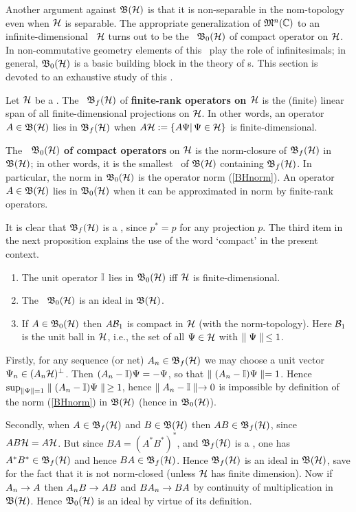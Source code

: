 Another argument against ${\frak B}({\cal H})$ is that it is non-separable in the
nom-topology even when ${\cal H}$ is separable. The appropriate
generalization of ${\frak M}^n({\Bbb C})$ to an infinite-dimensional \Hs\ ${\cal H}$
turns out to be the \ca\ ${\frak B}_0({\cal H})$ of compact operator on ${\cal H}$. In
non-commutative geometry elements of this \ca\ play the role of
infinitesimals; in general, ${\frak B}_0({\cal H})$ is a basic building block in
the theory of \ca s.  This section is devoted to an exhaustive study
of this \ca.
\begin{Definition}
Let ${\cal H}$ be a \Hs.  The \sta\ ${\frak B}_f({\cal H})$ of {\bf finite-rank operators
on ${\cal H}$} is the (finite) linear span of all finite-dimensional
projections on ${\cal H}$. In other words, an operator $A\in{\frak B}({\cal H})$ lies in
${\frak B}_f({\cal H})$ when $A{\cal H}:=\{A\Psi|\, \Psi\in{\cal H}\}$ is finite-dimensional.

The {\bf \ca\ ${\frak B}_0({\cal H})$ of compact operators} on ${\cal H}$ is the
norm-closure of ${\frak B}_f({\cal H})$ in ${\frak B}({\cal H})$; in other words, it is the
smallest \ca\ of ${\frak B}({\cal H})$ containing ${\frak B}_f({\cal H})$. In particular, the norm
in ${\frak B}_0({\cal H})$ is the operator norm (\ref{BHnorm}).  An operator $A\in{\frak B}({\cal H})$
lies in ${\frak B}_0({\cal H})$ when it can be approximated in norm by finite-rank
operators.
\end{Definition}
It is clear that ${\frak B}_f({\cal H})$ is a \sta, since $p^*=p$ for any
projection $p$.  The third item in the next proposition explains the
use of the word `compact' in the present context.
\begin{Proposition}
\begin{enumerate}
\item
The unit operator ${\Bbb I}$ lies in ${\frak B}_0({\cal H})$ iff ${\cal H}$ is
finite-dimensional.
\item
The \ca\ ${\frak B}_0({\cal H})$ is an ideal in ${\frak B}({\cal H})$.
\item
If $A\in{\frak B}_0({\cal H})$ then $A{\cal B}_1$ is compact in ${\cal H}$ (with the
norm-topology).  Here ${\cal B}_1$ is the unit ball in ${\cal H}$, i.e., the
set of all $\Psi\in{\cal H}$ with $\parallel\Psi\parallel\,\leq 1$.
\end{enumerate}
\end{Proposition}

Firstly, for any sequence (or net) $A_n\in{\frak B}_f({\cal H})$ we may choose a
unit vector $\Psi_n\in(A_n{\cal H})^{\perp}$. Then $(A_n-{\Bbb I})\Psi=-\Psi$, so
that $\parallel (A_n-{\Bbb I})\Psi\parallel=1$. Hence $\sup_{\parallel\Psi\parallel=1}\parallel
(A_n-{\Bbb I})\Psi\parallel\,\geq 1$, hence $\parallel A_n-{\Bbb I}\parallel\rightarrow 0$ is impossible by
definition of the norm (\ref{BHnorm}) in ${\frak B}({\cal H})$ (hence in ${\frak B}_0({\cal H})$).

Secondly, when $A\in{\frak B}_f({\cal H})$ and $B\in{\frak B}({\cal H})$ then $AB\in{\frak B}_f({\cal H})$,
since $AB{\cal H}=A{\cal H}$.  But since $BA=(A^*B^*)^*$, and ${\frak B}_f({\cal H})$ is a
\sta, one has $A^*B^*\in{\frak B}_f({\cal H})$ and hence $BA\in{\frak B}_f({\cal H})$. Hence
${\frak B}_f({\cal H})$ is an ideal in ${\frak B}({\cal H})$, save for the fact that it is not
norm-closed (unless ${\cal H}$ has finite dimension).  Now if $A_n\rightarrow A$
then $A_nB\rightarrow AB$ and $BA_n\rightarrow BA$ by continuity of multiplication
in ${\frak B}({\cal H})$.  Hence ${\frak B}_0({\cal H})$ is an ideal by virtue of its definition.

